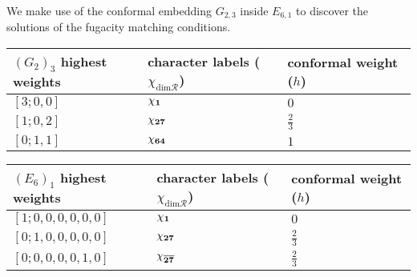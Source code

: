 \documentclass[a4paper,12pt]{article}
\begin{document}
We make use of the conformal embedding $G_{2,3}$ inside $E_{6,1}$ to discover the solutions of the fugacity matching conditions. 
%
\begin{center}
\begin{tabularx}{0.8\textwidth} { 
  | >{\centering\arraybackslash}X 
  | >{\centering\arraybackslash}X 
  | >{\centering\arraybackslash}X | }
 \hline
 $(G_2)_3$ highest weights & character labels ($\chi_{\mathrm{dim}\mathcal{R}}$) & conformal weight ($h$) \\
\hline
$[3;0,0]$  & $\chi_{\bf 1}$  & $0$ \\
\hline
$[1;0,2]$  & $\chi_{\bf 27}$  & $\frac{2}{3}$ \\
\hline
$[0;1,1]$  & $\chi_{\bf 64}$  & $1$ \\
\hline
\end{tabularx}
\end{center} 
%
\begin{center}
\begin{tabularx}{0.8\textwidth} { 
  | >{\centering\arraybackslash}X 
  | >{\centering\arraybackslash}X 
  | >{\centering\arraybackslash}X | }
 \hline
 $(E_6)_1$ highest weights & character labels ($\chi_{\mathrm{dim}\mathcal{R}}$)& conformal weight ($h$) \\
\hline
$[1;0,0,0,0,0,0]$  & $\chi_{\bf{1}}$  & $0$ \\
\hline
$[0;1,0,0,0,0,0]$  & $\chi_{\bf 27}$  & $\frac{2}{3}$ \\
\hline
$[0;0,0,0,0,1,0]$  & $\chi_{\bf{\overline{27}}}$  & $\frac{2}{3}$ \\
\hline
\end{tabularx}
\end{center} 
\end{document}
